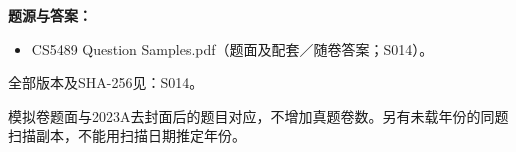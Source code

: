 \textbf{题源与答案：}

\begin{itemize}

\item CS5489 Question Samples.pdf（题面及配套／随卷答案；S014）。

\end{itemize}

全部版本及SHA-256见：S014。



模拟卷题面与2023A去封面后的题目对应，不增加真题卷数。另有未载年份的同题扫描副本，不能用扫描日期推定年份。


